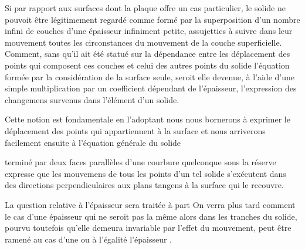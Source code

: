 \documentclass[11pt,a4paper]{article}
\begin{document}
Si  par rapport aux surfaces dont la
 plaque  offre un cas particulier, le solide
ne pouvoit être légitimement regardé comme formé par la superposition
d'un nombre infini de couches d'une épaisseur infiniment petite,
assujetties à suivre dans leur mouvement toutes les circonstances du
mouvement de la couche superficielle. Comment, sans qu'il ait
 été statué  sur la dépendance
 entre les déplacement des points qui composent
 ces couches et celui des autres points du solide
l'équation formée par la considération de la surface seule, seroit elle
devenue, à l'aide d'une simple multiplication par un coefficient
dépendant de l'épaisseur, l'expression  des
changemens survenus dans l'élément d'un solide.

Cette notion est fondamentale en l'adoptant nous nous bornerons à
exprimer le déplacement des points qui appartiennent à la surface et
nous arriverons facilement  ensuite à l'équation générale du
solide

terminé par deux faces parallèles d'une courbure quelconque sous la
réserve expresse que les mouvemens de tous les points d'un tel solide
s'exécutent dans des directions perpendiculaires aux plans tangens à la
surface qui le recouvre.

La question relative à l'épaisseur sera traitée à part On verra plus tard
comment le cas d'une épaisseur qui ne seroit pas la même alors dans
 les tranches du solide, pourvu  toutefois qu'elle demeura invariable par l'effet du
mouvement, peut être ramené au cas d'une ou à l'égalité l'épaisseur
. 
\end{document}
